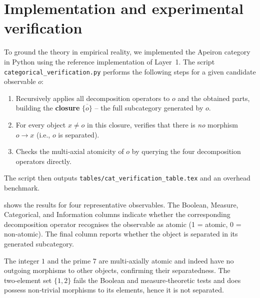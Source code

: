 \section{Implementation and experimental verification}\label{sec:impl}

To ground the theory in empirical reality, we implemented the Apeiron category in Python using the reference implementation of Layer~1.
The script \texttt{categorical\_verification.py} performs the following steps for a given candidate observable $o$:
\begin{enumerate}
\item Recursively applies all decomposition operators to $o$ and the obtained parts, building the \textbf{closure} $\overline{\{o\}}$ -- the full subcategory generated by $o$.
\item For every object $x \neq o$ in this closure, verifies that there is \emph{no} morphism $o \to x$ (i.e., $o$ is separated).
\item Checks the multi‑axial atomicity of $o$ by querying the four decomposition operators directly.
\end{enumerate}
The script then outputs \texttt{tables/cat\_verification\_table.tex} and an overhead benchmark.

 shows the results for four representative observables.
The Boolean, Measure, Categorical, and Information columns indicate whether the corresponding decomposition operator recognises the observable as atomic (1 = atomic, 0 = non‑atomic).
The final column reports whether the object is separated in its generated subcategory.

\begin{table}[htbp]
\centering
\caption{Verification of the separated‑object property using closure under decomposition.}
\label{tab:cat_verify}

\end{table}

The integer $1$ and the prime $7$ are multi‑axially atomic and indeed have no outgoing morphisms to other objects, confirming their separatedness.
The two‑element set $\{1,2\}$ fails the Boolean and measure‑theoretic tests and does possess non‑trivial morphisms to its elements, hence it is not separated.

